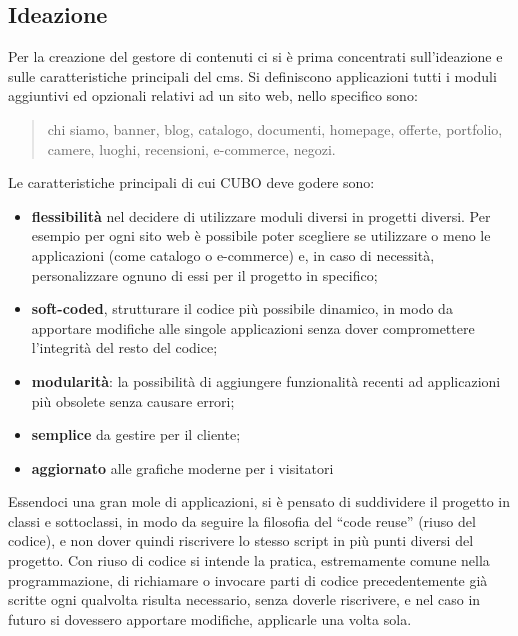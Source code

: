 \documentclass[12pt,a4paper]{article}
\begin{document}
\subsection{Ideazione}
Per la creazione del gestore di contenuti ci si è prima concentrati sull’ideazione e sulle caratteristiche principali del cms.
Si definiscono applicazioni tutti i moduli aggiuntivi ed opzionali relativi ad un sito web, nello specifico sono:
\begin{quote}
    chi siamo, banner, blog, catalogo, documenti, homepage, offerte, portfolio, camere, luoghi, recensioni, e-commerce, negozi.
\end{quote}
Le caratteristiche principali di cui CUBO deve godere sono:
\begin{itemize}
    \item \textbf{flessibilità} nel decidere di utilizzare moduli diversi in progetti diversi. Per esempio per ogni sito web è possibile poter scegliere se utilizzare o meno le applicazioni (come catalogo o e-commerce) e, in caso di necessità, personalizzare ognuno di essi per il progetto in specifico;
    \item \textbf{soft-coded}, strutturare il codice più possibile dinamico, in modo da apportare modifiche alle singole applicazioni senza dover compromettere l’integrità del resto del codice;
    \item \textbf{modularità}: la possibilità di aggiungere funzionalità recenti ad applicazioni più obsolete senza causare errori;
    \item \textbf{semplice} da gestire per il cliente;
    \item \textbf{aggiornato} alle grafiche moderne per i visitatori
\end{itemize}
Essendoci una gran mole di applicazioni, si è pensato di suddividere il progetto in classi e sottoclassi, in modo da seguire la filosofia del “code reuse” (riuso del codice), e non dover quindi riscrivere lo stesso script in più punti diversi del progetto.
Con riuso di codice si intende la pratica, estremamente comune nella programmazione, di richiamare o invocare parti di codice precedentemente già scritte ogni qualvolta risulta necessario, senza doverle riscrivere, e nel caso in futuro si dovessero apportare modifiche, applicarle una volta sola.

\clearpage
\end{document}
